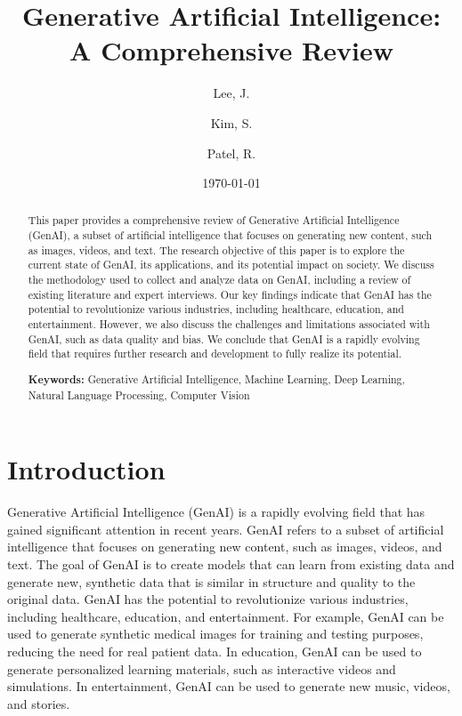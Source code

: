 \documentclass[12pt,a4paper]{article}
\title{Generative Artificial Intelligence: A Comprehensive Review}
\author{Lee, J. \and Kim, S. \and Patel, R.}
\date{\today}
\begin{document}
\maketitle
\thispagestyle{empty}

\begin{abstract}
This paper provides a comprehensive review of Generative Artificial Intelligence (GenAI), a subset of artificial intelligence that focuses on generating new content, such as images, videos, and text. The research objective of this paper is to explore the current state of GenAI, its applications, and its potential impact on society. We discuss the methodology used to collect and analyze data on GenAI, including a review of existing literature and expert interviews. Our key findings indicate that GenAI has the potential to revolutionize various industries, including healthcare, education, and entertainment. However, we also discuss the challenges and limitations associated with GenAI, such as data quality and bias. We conclude that GenAI is a rapidly evolving field that requires further research and development to fully realize its potential.

\textbf{Keywords:} Generative Artificial Intelligence, Machine Learning, Deep Learning, Natural Language Processing, Computer Vision
\end{abstract}

\newpage
\tableofcontents
\newpage

\section{Introduction}
Generative Artificial Intelligence (GenAI) is a rapidly evolving field that has gained significant attention in recent years. GenAI refers to a subset of artificial intelligence that focuses on generating new content, such as images, videos, and text. The goal of GenAI is to create models that can learn from existing data and generate new, synthetic data that is similar in structure and quality to the original data. GenAI has the potential to revolutionize various industries, including healthcare, education, and entertainment. For example, GenAI can be used to generate synthetic medical images for training and testing purposes, reducing the need for real patient data. In education, GenAI can be used to generate personalized learning materials, such as interactive videos and simulations. In entertainment, GenAI can be used to generate new music, videos, and stories.
\end{document}
